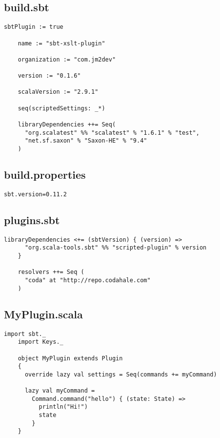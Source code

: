 \documentclass[utf8,utf8x]{beamer}
\begin{document}
\subsection{build.sbt}
\begin{frame}[fragile]

  \begin{lstlisting}[title={build.sbt}]
    sbtPlugin := true

    name := "sbt-xslt-plugin"

    organization := "com.jm2dev"

    version := "0.1.6"

    scalaVersion := "2.9.1"

    seq(scriptedSettings: _*)

    libraryDependencies ++= Seq(
      "org.scalatest" %% "scalatest" % "1.6.1" % "test",
      "net.sf.saxon" % "Saxon-HE" % "9.4"
    )    
  \end{lstlisting}

\end{frame}

\subsection{build.properties}
\begin{frame}[fragile]

  \begin{lstlisting}[title={project/build.properties}]
    sbt.version=0.11.2
  \end{lstlisting}

\end{frame}

\subsection{plugins.sbt}
\begin{frame}[fragile]
  \begin{lstlisting}[title={project/plugins.sbt}]
    libraryDependencies <+= (sbtVersion) { (version) =>
      "org.scala-tools.sbt" %% "scripted-plugin" % version
    }

    resolvers ++= Seq (
      "coda" at "http://repo.codahale.com"
    )
  \end{lstlisting}

\end{frame}

\subsection{MyPlugin.scala}
\begin{frame}[fragile]
  \begin{lstlisting}[title={src/main/scala/MyPlugin.scala}]
    import sbt._
    import Keys._

    object MyPlugin extends Plugin
    {
      override lazy val settings = Seq(commands += myCommand)

      lazy val myCommand = 
        Command.command("hello") { (state: State) =>
          println("Hi!")
          state
        }
    }
  \end{lstlisting}

\end{frame}
\end{document}
